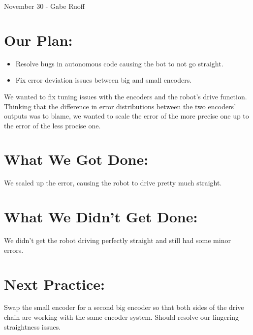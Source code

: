 \documentclass[12pt]{article}
\begin{document}
November 30 - Gabe Ruoff

\section{Our Plan:}
\begin{itemize}
	\item Resolve bugs in autonomous code causing the bot to not go straight.
	\item Fix error deviation issues between big and small encoders.
\end{itemize}

We wanted to fix tuning issues with the encoders and the robot's drive function. Thinking that the difference in error distributions between the two encoders' outputs was to blame, we wanted to scale the error of the more precise one up to the error of the less procise one.

\section{What We Got Done:}

We scaled up the error, causing the robot to drive pretty much straight.

\section{What We Didn't Get Done:}

We didn't get the robot driving perfectly straight and still had some minor errors.

\section{Next Practice:}

Swap the small encoder for a second big encoder so that both sides of the drive chain are working with the same encoder system. Should resolve our lingering straightness issues.
\end{document}
